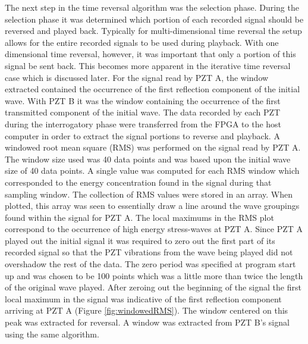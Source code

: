 The next step in the time reversal algorithm was the selection phase. During the selection phase it was determined which portion of each recorded signal should be reversed and played back. Typically for multi-dimensional time reversal the setup allows for the entire recorded signals to be used during playback. With one dimensional time reversal, however, it was important that only a portion of this signal be sent back. This becomes more apparent in the iterative time reversal case which is discussed later. For the signal read by PZT A, the window extracted contained the occurrence of the first reflection component of the initial wave. With PZT B it was the window containing the occurrence of the first transmitted component of the initial wave. The data recorded by each PZT during the interrogatory phase were transferred from the FPGA to the host computer in order to extract the signal portions to reverse and playback. A windowed root mean square (RMS) was performed on the signal read by PZT A. The window size used was 40 data points and was based upon the initial wave size of 40 data points. A single value was computed for each RMS window which corresponded to the energy concentration found in the signal during that sampling window. The collection of RMS values were stored in an array. When plotted, this array was seen to essentially draw a line around the wave groupings found within the signal for PZT A. The local maximums in the RMS plot correspond to the occurrence of high energy stress-waves at PZT A. Since PZT A played out the initial signal it was required to zero out the first part of its recorded signal so that the PZT vibrations from the wave being played did not overshadow the rest of the data. The zero period was specified at program start up and was chosen to be 100 points which was a little more than twice the length of the original wave played. After zeroing out the beginning of the signal the first local maximum in the signal was indicative of the first reflection component arriving at PZT A (Figure \ref{fig:windowedRMS}). The window centered on this peak was extracted for reversal. A window was extracted from PZT B's signal using the same algorithm.


